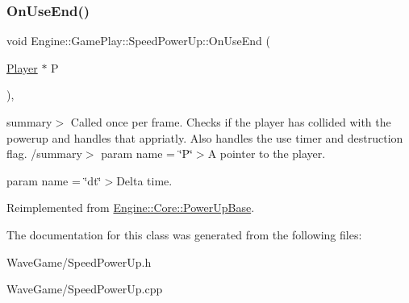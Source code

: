 \subsubsection{\texorpdfstring{On\+Use\+End()}{OnUseEnd()}}
{\footnotesize\ttfamily void Engine\+::\+Game\+Play\+::\+Speed\+Power\+Up\+::\+On\+Use\+End (\begin{DoxyParamCaption}\item[{\hyperlink{class_engine_1_1_game_play_1_1_player}{Player} $\ast$}]{P }\end{DoxyParamCaption})\hspace{0.3cm}{\ttfamily [override]}, {\ttfamily [virtual]}}

summary$>$ Called once per frame. Checks if the player has collided with the powerup and handles that appriatly. Also handles the use timer and destruction flag. /summary$>$ param name = \char`\"{}\+P\char`\"{}$>$A pointer to the player.

param name = \char`\"{}dt\char`\"{}$>$Delta time.

Reimplemented from \hyperlink{class_engine_1_1_core_1_1_power_up_base_a195aecea60afdb99add60661a1c95697}{Engine\+::\+Core\+::\+Power\+Up\+Base}.



The documentation for this class was generated from the following files\+:\begin{DoxyCompactItemize}
\item 
Wave\+Game/Speed\+Power\+Up.\+h\item 
Wave\+Game/Speed\+Power\+Up.\+cpp\end{DoxyCompactItemize}
